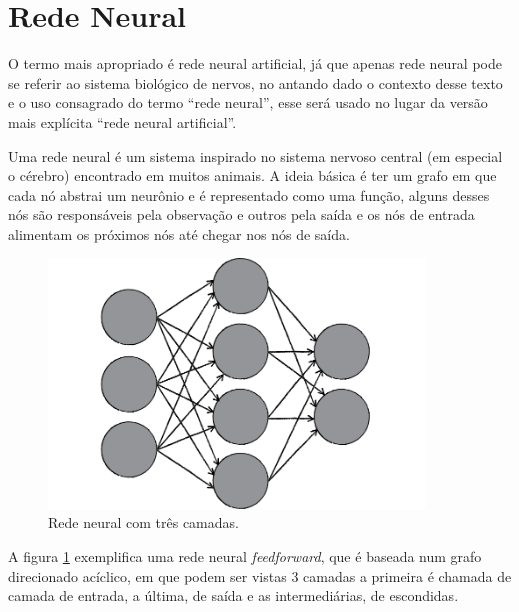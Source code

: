 \section{Rede Neural}

O termo mais apropriado é rede neural artificial, já que apenas rede
neural pode se referir ao sistema biológico de nervos, no antando dado o
contexto desse texto e o uso consagrado do termo ``rede neural'', esse
será usado no lugar da versão mais explícita ``rede neural artificial''.

Uma rede neural é um sistema inspirado no sistema nervoso central (em
especial o cérebro) encontrado em muitos animais. A ideia básica é ter
um grafo em que cada nó abstrai um neurônio e é representado como uma
função, alguns desses nós são responsáveis pela observação e outros pela
saída e os nós de entrada alimentam os próximos nós até chegar nos nós
de saída. \cite{haykin2001redes}


\begin{figure}[ht]
\centering
\includegraphics[width=10cm]{figuras/rede_neural_grafo}
\caption{Rede neural com três camadas.}\label{fig:rede_neural_grafo}
\end{figure}

A figura \ref{fig:rede_neural_grafo} exemplifica uma rede neural \emph{feedforward},
que é baseada num grafo direcionado acíclico, em que podem ser vistas 3 camadas
a primeira é chamada de camada de entrada, a última, de saída e as intermediárias,
de escondidas. \cite{shiffman2012nature}

